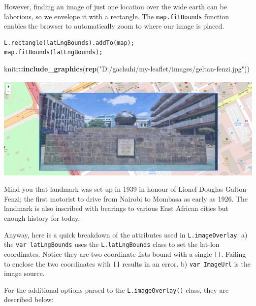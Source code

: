 \documentclass[
]{book}
\newenvironment{Shaded}{\begin{snugshade}}{\end{snugshade}}
\newcommand{\FunctionTok}[1]{\textcolor[rgb]{0.13,0.29,0.53}{\textbf{#1}}}
\newcommand{\NormalTok}[1]{#1}
\newcommand{\SpecialCharTok}[1]{\textcolor[rgb]{0.81,0.36,0.00}{\textbf{#1}}}
\newcommand{\StringTok}[1]{\textcolor[rgb]{0.31,0.60,0.02}{#1}}
\begin{document}
However, finding an image of just one location over the wide earth can be laborious, so we envelope it with a rectangle. The \texttt{map.fitBounds} function enables the browser to automatically zoom to where our image is placed.

\begin{verbatim}
L.rectangle(latLngBounds).addTo(map);
map.fitBounds(latLngBounds);
\end{verbatim}

\begin{Shaded}
\begin{Highlighting}[]
\NormalTok{knitr}\SpecialCharTok{::}\FunctionTok{include\_graphics}\NormalTok{(}\FunctionTok{rep}\NormalTok{(}\StringTok{"D:/gachuhi/my{-}leaflet/images/geltan{-}fenzi.jpg"}\NormalTok{))}
\end{Highlighting}
\end{Shaded}

\includegraphics{../images/geltan-fenzi.jpg}

Mind you that landmark was set up in 1939 in honour of Lionel Douglas Galton-Fenzi; the first motorist to drive from Nairobi to Mombasa as early as 1926. The landmark is also inscribed with bearings to various East African cities but enough history for today.

Anyway, here is a quick breakdown of the attributes used in \texttt{L.imageOverlay}: a) the \texttt{var\ latLngBounds} uses the \texttt{L.latLngBounds} class to set the lat-lon coordinates. Notice they are two coordinate lists bound with a single \texttt{{[}{]}}. Failing to enclose the two coordinates with \texttt{{[}{]}} results in an error. b) \texttt{var\ ImageUrl} is the image source.

For the additional options parsed to the \texttt{L.imageOverlay()} class, they are described below:
\end{document}
